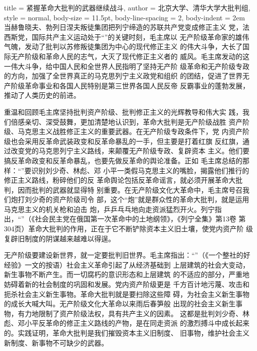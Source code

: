 \begin{hongqiarticle}{
        title  = {紧握革命大批判的武器继续战斗},
        author = {北京大学、清华大学大批判组},
        style  = normal,
        body-size = 11.5pt,
        body-line-spacing = 2,
        body-indent = 2em
    }
    当赫鲁晓夫、勃列日涅夫叛徒集团把列宁缔造的苏联共产党变成修正主义
    党，法西斯党，国际共产主义运动处于“”的关键时刻，毛主席以
    无产阶级革命家的雄伟气魄，发动了批判以苏修叛徒集团为中心的现代修正主义
    的伟大斗争，大长了国际无产阶级和革命人民的志气，大灭了现代修正主义者的
    威风。毛主席发动的这一伟大斗争，给中国人民和全世界人民指明了坚持无产阶
    级革命和无产阶级专政的方向，加强了全世界真正的马克思列宁主义政党和组织
    的团结，促进了世界无产阶级革命事业和各国人民特别是第三世界各国人民反帝
    反霸事业的蓬勃发展，推动了人类历史的前进。
    
    重温和回顾毛主席坚持批判资产阶级、批判修正主义的光辉教导和伟大实
    践，我们倍感亲切、深受鼓舞，更加清楚地认识到，革命大批判是无产阶级战胜
    资产阶级、马克思主义战胜修正主义的重要武器。在无产阶级专政条件下，党
    内资产阶级也会采用反革命武装政变和反革命暴乱的一手，但主要是打着红旗
    反红旗，通过改变党的马克思列宁主义路线，来颠覆无产阶级专政、复辟资本
    主义。他们要搞反革命政变和反革命暴乱，也要先做反革命的舆论准备。正如
    毛主席总结的那样：“”要识别刘少奇、林彪、邓
    小平一类假马克思主义的嘴脸，揭露他们推行的修正主义路线，粉碎他们的反
    革命舆论包括反革命谣言，就必须开展革命大批判，因而批判的武器就显得特
    别重要。在无产阶级文化大革命中，毛主席号召我们炮打刘少奇的资产阶级司令
    部，这个“炮”就是群众性的革命大批判，就是运用马克思主义的机关枪和迫击
    炮，乒乒乓乓地向走资派猛烈开火。列宁指出，“”（《社会民主党在俄国第一次革命中的土地纲领》，《列宁全集》第13卷
    第304页）革命大批判的作用，正在于它不断铲除资本主义旧土壤，使党内资产阶
    级复辟旧制度的阴谋越来越难以得逞。
    
    无产阶级要建设新世界，就一定要批判旧世界。毛主席指出：“”（《一个整社的好经验》一文的按语）社会主义革命引起了从经济基础到
    上层建筑的社会大变动，新生事物不断产生。而一切腐朽的意识形态和上层建筑
    的不适应的部分，严重地妨碍着新的社会制度的巩固和发展。党内资产阶级更是
    千方百计地污蔑、攻击和扼杀社会主义新生事物。革命大批判就是要扫除这些障
    碍，为社会主义新生事物的成长大喊大叫。无产阶级文化大革命以来雨后春笋般
    出现的社会主义新生事物，有力地限制了资产阶级法权，具有共产主义的因素。
    这都是批判刘少奇、林彪、邓小平反革命的修正主义路线的产物，是在同走资派
    的激烈搏斗中成长起来的。实践证明，革命大批判是我们摧毁资本主义旧制度、
    旧事物，维护社会主义新制度、新事物不可缺少的武器。
    

\end{hongqiarticle}
